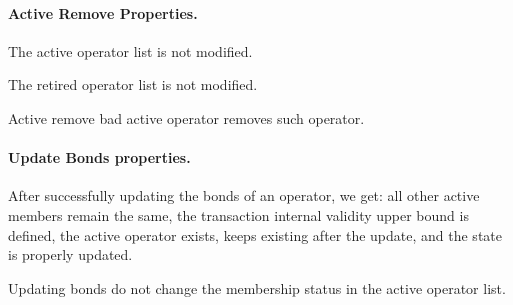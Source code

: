 \paragraph*{Active Remove Properties.}
\begin{theorem}
  \leanok
  \label{thm:OperatorDirectory.Properties.Actions.active_remove_bad_registered}
  The active operator list is not modified.
  \end{theorem}
\begin{theorem}
  \leanok
  \label{thm:OperatorDirectory.Properties.Actions.retired_remove_bad_registered}
  The retired operator list is not modified.
  \end{theorem}

\begin{theorem}
  \leanok
  \label{thm:OperatorDirectory.Properties.Actions.active_remove_bad_active_keys}
  Active remove bad active operator removes such operator.
  \end{theorem}

\paragraph*{Update Bonds properties.}

\begin{theorem}
  \leanok
  \label{thm:OperatorDirectory.Properties.Actions.update_bond_hold_active_keys}
  After successfully updating the bonds of an operator, we get:
  all other active members remain the same, the transaction internal validity
upper bound is defined, the active operator exists, keeps existing after the
update, and the state is properly updated.
  \end{theorem}

\begin{theorem}
  \leanok
  \label{thm:OperatorDirectory.Properties.Actions.update_bond_hold_same_act_members}
  Updating bonds do not change the membership status in the active operator list.
  \end{theorem}

